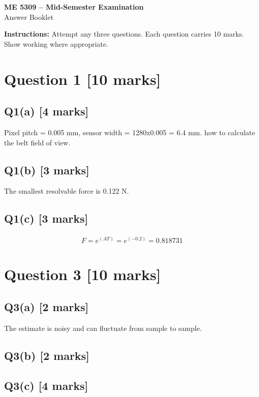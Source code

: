 \documentclass[11pt,a4paper]{article}
\begin{document}
\begin{center}
{\Large\bfseries ME 5309 -- Mid-Semester Examination}\\[3pt]
{\large Answer Booklet}\\[8pt]
\end{center}
\textbf{Instructions:} Attempt any three questions. Each question carries 10 marks. Show working where appropriate.
\section*{Question 1 \hfill [10 marks]}
\subsection*{Q1(a) \hfill [4 marks]}

Pixel pitch = 0.005 mm, sensor width = 1280x0.005 = 6.4 mm. how to calculate the belt field of view.

\subsection*{Q1(b) \hfill [3 marks]}

The smallest resolvable force is 0.122 N.

\subsection*{Q1(c) \hfill [3 marks]}

\[\begin{aligned}F = e^(AT) = e^(-0.2) = 0.818731\end{aligned}\]

\section*{Question 3 \hfill [10 marks]}
\subsection*{Q3(a) \hfill [2 marks]}

The estimate is noisy and can fluctuate from sample to sample.

\subsection*{Q3(b) \hfill [2 marks]}

\vspace{2mm}

\subsection*{Q3(c) \hfill [4 marks]}
\end{document}
